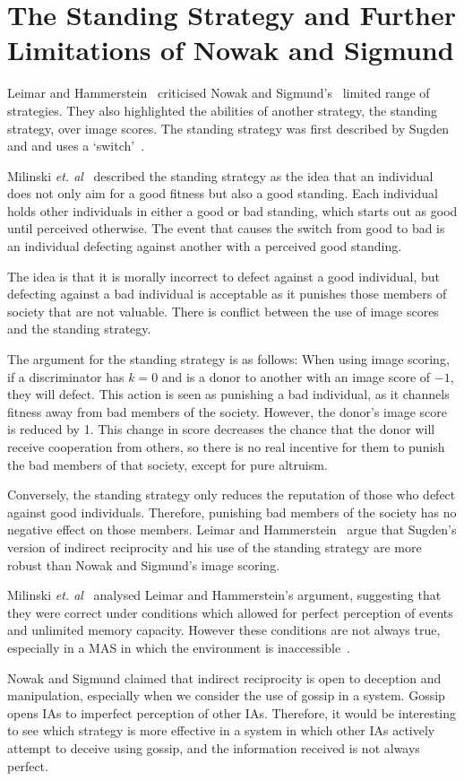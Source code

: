 \documentclass[]{final_report}
\begin{document}
\section{The Standing Strategy and Further Limitations of Nowak and Sigmund}
Leimar and Hammerstein~\cite{leimarhammer} criticised Nowak and Sigmund's~\cite{evol_indirect_image} limited range of strategies. They also highlighted the abilities of another strategy, the standing strategy, over image scores.  The standing strategy was first described by Sugden~\cite{sugden2004economics} and and uses a `switch'~\cite{evol_indirect_image}.\par
Milinski \textit{et. al}~\cite{imagevsstanding} described the standing strategy as the idea that an individual does not only aim for a good fitness but also a good standing. Each individual holds other individuals in either a good or bad standing, which starts out as good until perceived otherwise. The event that causes the switch from good to bad is an individual defecting against another with a perceived good standing.\par
The idea is that it is morally incorrect to defect against a good individual, but defecting against a bad individual is acceptable as it punishes those members of society that are not valuable. There is conflict between the use of image scores and the standing strategy.\par
The argument for the standing strategy is as follows: When using image scoring, if a discriminator has $k=0$ and is a donor to another with an image score of $-1$, they will defect. This action is seen as punishing a bad individual, as it channels fitness away from bad members of the society. However, the donor's image score is reduced by 1. This change in score decreases the chance that the donor will receive cooperation from others, so there is no real incentive for them to punish the bad members of that society, except for pure altruism.\par
Conversely, the standing strategy only reduces the reputation of those who defect against good individuals. Therefore, punishing bad members of the society has no negative effect on those members. Leimar and Hammerstein~\cite{leimarhammer} argue that Sugden's version of indirect reciprocity and his use of the standing strategy are more robust than Nowak and Sigmund's image scoring.\par
Milinski \textit{et. al}~\cite{imagevsstanding} analysed Leimar and Hammerstein's argument, suggesting that they were correct under conditions which allowed for perfect perception of events and unlimited memory capacity. However these conditions are not always true, especially in a MAS in which the environment is inaccessible~\cite{russell2016artificial}.\par
Nowak and Sigmund claimed that indirect reciprocity is open to deception and manipulation, especially when we consider the use of gossip in a system. Gossip opens IAs to imperfect perception of other IAs. Therefore, it would be interesting to see which strategy is more effective in a system in which other IAs actively attempt to deceive using gossip, and the information received is not always perfect.
\end{document}
